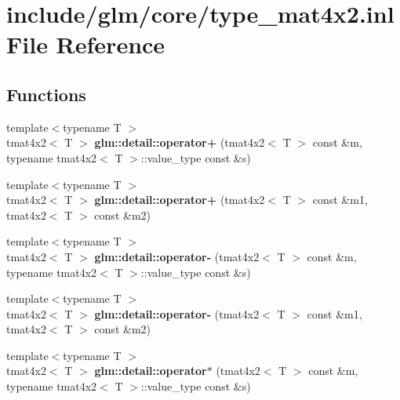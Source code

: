 \hypertarget{type__mat4x2_8inl}{\section{include/glm/core/type\-\_\-mat4x2.inl \-File \-Reference}
\label{type__mat4x2_8inl}
}
\subsection*{\-Functions}
\begin{DoxyCompactItemize}
\item 
\hypertarget{namespaceglm_1_1detail_ab11ff2024ca52b13c0468d163fbf6771}{{\footnotesize template$<$typename T $>$ }\\tmat4x2$<$ \-T $>$ {\bfseries glm\-::detail\-::operator+} (tmat4x2$<$ \-T $>$ const \&m, typename tmat4x2$<$ \-T $>$\-::value\-\_\-type const \&s)}\label{namespaceglm_1_1detail_ab11ff2024ca52b13c0468d163fbf6771}

\item 
\hypertarget{namespaceglm_1_1detail_a810cc1c43a0dbf079f9d58fad66c445a}{{\footnotesize template$<$typename T $>$ }\\tmat4x2$<$ \-T $>$ {\bfseries glm\-::detail\-::operator+} (tmat4x2$<$ \-T $>$ const \&m1, tmat4x2$<$ \-T $>$ const \&m2)}\label{namespaceglm_1_1detail_a810cc1c43a0dbf079f9d58fad66c445a}

\item 
\hypertarget{namespaceglm_1_1detail_afab1db16e996a791641ff6d283a166a6}{{\footnotesize template$<$typename T $>$ }\\tmat4x2$<$ \-T $>$ {\bfseries glm\-::detail\-::operator-\/} (tmat4x2$<$ \-T $>$ const \&m, typename tmat4x2$<$ \-T $>$\-::value\-\_\-type const \&s)}\label{namespaceglm_1_1detail_afab1db16e996a791641ff6d283a166a6}

\item 
\hypertarget{namespaceglm_1_1detail_a8423726d81e9fdc2475cf1d89ded7fdc}{{\footnotesize template$<$typename T $>$ }\\tmat4x2$<$ \-T $>$ {\bfseries glm\-::detail\-::operator-\/} (tmat4x2$<$ \-T $>$ const \&m1, tmat4x2$<$ \-T $>$ const \&m2)}\label{namespaceglm_1_1detail_a8423726d81e9fdc2475cf1d89ded7fdc}

\item 
\hypertarget{namespaceglm_1_1detail_ac80249a6743356653378cf6efabf6aca}{{\footnotesize template$<$typename T $>$ }\\tmat4x2$<$ \-T $>$ {\bfseries glm\-::detail\-::operator$\ast$} (tmat4x2$<$ \-T $>$ const \&m, typename tmat4x2$<$ \-T $>$\-::value\-\_\-type const \&s)}\label{namespaceglm_1_1detail_ac80249a6743356653378cf6efabf6aca}


\end{DoxyCompactItemize}
